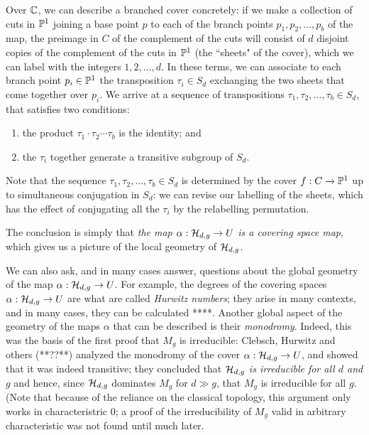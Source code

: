 Over $\CC$, we can describe a branched cover concretely: if we make a collection of cuts in $\PP^1$ joining a base point $p$ to each of the branch points $p_1, p_2, \dots, p_b$ of the map, the preimage in $C$ of the complement of the cuts will consist of $d$ disjoint copies of the complement of the cuts in $\PP^1$ (the ``sheets" of the cover), which we can label with the integers $1, 2, \dots, d$. In these terms, we can associate to each branch point $p_i \in \PP^1$ the transposition $\tau_i \in S_d$ exchanging the two sheets that come together over $p_i$. We arrive at a sequence of transpositions $\tau_1, \tau_2, \dots, \tau_b \in S_d$, that satisfies two conditions:

\begin{enumerate}
\item the product $\tau_1\cdot \tau_2 \cdots \tau_b$ is the identity; and
\item the $\tau_i$ together generate a transitive subgroup of $S_d$.
\end{enumerate}

Note that the sequence $\tau_1, \tau_2, \dots, \tau_b \in S_d$ is determined by the cover $f : C \to \PP^1$ up to simultaneous conjugation in $S_d$: we can revise our labelling of the sheets, which has the effect of conjugating all the $\tau_i$ by the relabelling permutation.

The conclusion is simply that \emph{the map $\alpha : \cH_{d,g} \to U$ is a covering space map}, which gives us a picture of the local geometry of $\cH_{d,g}$. 

We can also ask, and in many cases answer, questions about the global geometry of the map $\alpha : \cH_{d,g} \to U$. For example, the degrees of the covering spaces $\alpha : \cH_{d,g} \to U$ are what are called \emph{Hurwitz numbers}; they arise in many contexts, and in many cases, they can be calculated **\cite{}**. Another global aspect of the geometry of the maps $\alpha$ that can be described is their \emph{monodromy}. Indeed, this  was the basis of the first proof that $M_g$ is irreducible: Clebsch, Hurwitz and others (**??**) analyzed the monodromy of the cover $\alpha : \cH_{d,g} \to U$, and showed that it was indeed transitive; they concluded that \emph{$\cH_{d,g}$ is irreducible for all $d$ and $g$} and hence, since $\cH_{d,g}$ dominates $M_g$ for $d \gg g$, that $M_g$ is irreducible for all $g$. (Note that because of the reliance on the classical topology, this argument only works in characteristric 0; a proof of the irreducibility of $M_g$ valid in arbitrary characteristic was not found until much later. 

